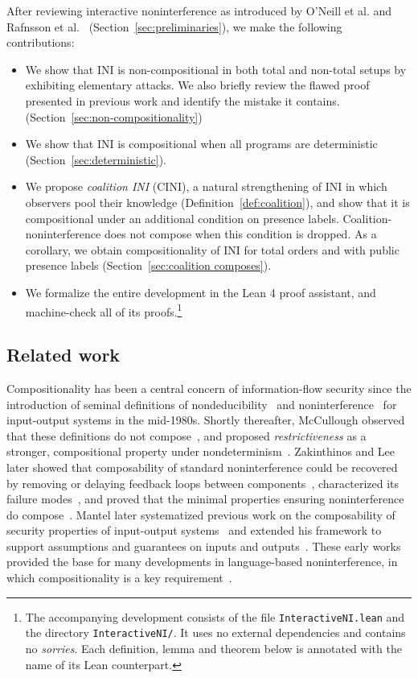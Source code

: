 \documentclass[preprint,5p,twocolumn]{elsarticle}
\begin{document}
After reviewing interactive noninterference as introduced by O'Neill et al. and Rafnsson et al.~\cite{ONeill2006,Rafnsson2012}
(Section~\ref{sec:preliminaries}), we make the following contributions:
\begin{itemize}
\item We show that INI is non-compositional in both total and non-total setups by exhibiting elementary
  attacks. We also briefly review the flawed proof presented in previous work and identify the mistake it contains.
  (Section~\ref{sec:non-compositionality})
\item We show that INI is compositional when all programs are deterministic (Section~\ref{sec:deterministic}).
\item We propose \emph{coalition INI} (CINI), a natural strengthening of
  INI in which observers pool
  their knowledge (Definition~\ref{def:coalition}), and show that it is compositional
  under an additional condition on presence labels.
  Coalition-noninterference does not compose when this condition is dropped.
  As a corollary, we obtain compositionality of INI for total orders and with public presence labels
  (Section~\ref{sec:coalition composes}).
\item We formalize the entire development in the Lean 4 proof assistant, and machine-check all of its
  proofs.\footnote{The accompanying development consists of the file \texttt{InteractiveNI.lean} and
  the directory \texttt{InteractiveNI/}. It uses no external dependencies and contains
  no \emph{sorries}. Each definition, lemma and
  theorem below is annotated with the name of its Lean counterpart.}
\end{itemize}

\subsection{Related work}

Compositionality has been a central concern of information-flow security since the 
introduction of seminal definitions of nondeducibility~\cite{Sutherland1986} and 
noninterference~\cite{Goguen1984} for input-output systems in the mid-1980s.
Shortly thereafter, McCullough observed that these definitions do not
compose~\cite{McCullough1988}, and proposed \emph{restrictiveness}
as a stronger, compositional property under nondeterminism~\cite{McCullough1990}.
Zakinthinos and Lee later showed that composability of standard noninterference could be
recovered by removing or delaying feedback loops between components~\cite{Zakinthinos1995},
characterized its failure modes~\cite{Zakinthinos1996},
and proved that the minimal properties ensuring noninterference do compose~\cite{Zakinthinos1997}.
Mantel later systematized previous work on the composability of security properties of
input-output systems~\cite{Mantel2002} and extended his framework to support assumptions
and guarantees on inputs and outputs~\cite{Mantel2011}. These early works provided the
base for many developments in language-based noninterference, in which compositionality
is a key requirement~\cite{Sabelfeld2000,Mantel2003,Karbyshev2018,Frumin2021}.
\end{document}
